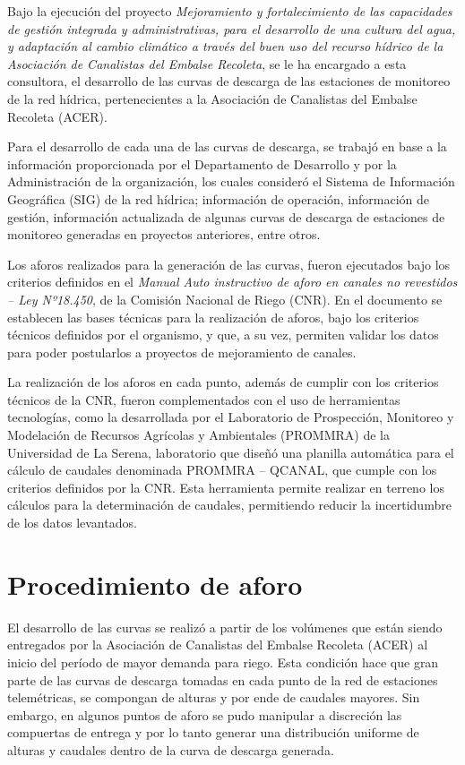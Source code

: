 \documentclass[]{article}
\begin{document}
Bajo la ejecución del proyecto \emph{Mejoramiento y fortalecimiento de
las capacidades de gestión integrada y administrativas, para el
desarrollo de una cultura del agua, y adaptación al cambio climático a
través del buen uso del recurso hídrico de la Asociación de Canalistas
del Embalse Recoleta}, se le ha encargado a esta consultora, el
desarrollo de las curvas de descarga de las estaciones de monitoreo de
la red hídrica, pertenecientes a la Asociación de Canalistas del Embalse
Recoleta (ACER).

Para el desarrollo de cada una de las curvas de descarga, se trabajó en
base a la información proporcionada por el Departamento de Desarrollo y
por la Administración de la organización, los cuales consideró el
Sistema de Información Geográfica (SIG) de la red hídrica; información
de operación, información de gestión, información actualizada de algunas
curvas de descarga de estaciones de monitoreo generadas en proyectos
anteriores, entre otros.

Los aforos realizados para la generación de las curvas, fueron
ejecutados bajo los criterios definidos en el \emph{Manual Auto
instructivo de aforo en canales no revestidos -- Ley Nº18.450}, de la
Comisión Nacional de Riego (CNR). En el documento se establecen las
bases técnicas para la realización de aforos, bajo los criterios
técnicos definidos por el organismo, y que, a su vez, permiten validar
los datos para poder postularlos a proyectos de mejoramiento de canales.

La realización de los aforos en cada punto, además de cumplir con los
criterios técnicos de la CNR, fueron complementados con el uso de
herramientas tecnologías, como la desarrollada por el Laboratorio de
Prospección, Monitoreo y Modelación de Recursos Agrícolas y Ambientales
(PROMMRA) de la Universidad de La Serena, laboratorio que diseñó una
planilla automática para el cálculo de caudales denominada PROMMRA --
QCANAL, que cumple con los criterios definidos por la CNR. Esta
herramienta permite realizar en terreno los cálculos para la
determinación de caudales, permitiendo reducir la incertidumbre de los
datos levantados.

\newpage

\section{Procedimiento de aforo}\label{procedimiento-de-aforo}

El desarrollo de las curvas se realizó a partir de los volúmenes que
están siendo entregados por la Asociación de Canalistas del Embalse
Recoleta (ACER) al inicio del período de mayor demanda para riego. Esta
condición hace que gran parte de las curvas de descarga tomadas en cada
punto de la red de estaciones telemétricas, se compongan de alturas y
por ende de caudales mayores. Sin embargo, en algunos puntos de aforo se
pudo manipular a discreción las compuertas de entrega y por lo tanto
generar una distribución uniforme de alturas y caudales dentro de la
curva de descarga generada.
\end{document}
